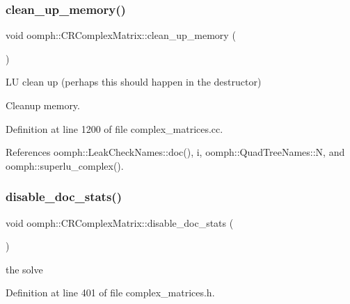 \subsubsection{\texorpdfstring{clean\+\_\+up\+\_\+memory()}{clean\_up\_memory()}}
{\footnotesize\ttfamily void oomph\+::\+C\+R\+Complex\+Matrix\+::clean\+\_\+up\+\_\+memory (\begin{DoxyParamCaption}{ }\end{DoxyParamCaption})}



LU clean up (perhaps this should happen in the destructor) 

Cleanup memory. 

Definition at line 1200 of file complex\+\_\+matrices.\+cc.



References oomph\+::\+Leak\+Check\+Names\+::doc(), i, oomph\+::\+Quad\+Tree\+Names\+::N, and oomph\+::superlu\+\_\+complex().

\mbox{\label{classoomph_1_1CRComplexMatrix_aacd1c3945b8a266141fbc7c32d7eb4c7}} 
\subsubsection{\texorpdfstring{disable\+\_\+doc\+\_\+stats()}{disable\_doc\_stats()}}
{\footnotesize\ttfamily void oomph\+::\+C\+R\+Complex\+Matrix\+::disable\+\_\+doc\+\_\+stats (\begin{DoxyParamCaption}{ }\end{DoxyParamCaption})\hspace{0.3cm}{\ttfamily [inline]}}



the solve 



Definition at line 401 of file complex\+\_\+matrices.\+h.

\mbox{\label{classoomph_1_1CRComplexMatrix_a2a36aa0cbdba895ffd0b83f1d9575325}} 
